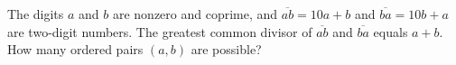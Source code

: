 The digits $a$ and $b$ are nonzero and coprime, and $\overline{ab}=10a+b$ and $\overline{ba}=10b+a$ are two-digit numbers. The greatest common divisor of $\overline{ab}$ and $\overline{ba}$ equals $a+b$. How many ordered pairs $(a,b)$ are possible?
